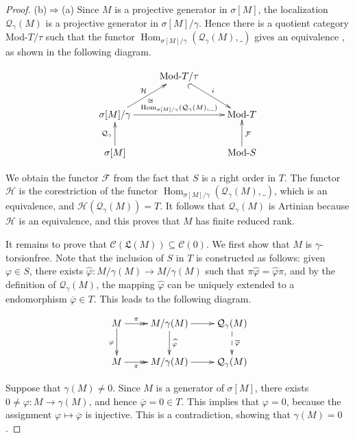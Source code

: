 \documentclass{amsart}
\theoremstyle{definition}
\theoremstyle{remark}
\numberwithin{equation}{section}
\DeclareMathOperator{\Hom}{Hom}
\newcommand{\sm}{\sigma[M]}
\begin{document}
\begin{proof}
	(b)$\Rightarrow$(a) 
	Since $M$ is a projective generator in $\sm$, 
	the localization $\mathcal{Q}_\gamma(M)$ 
	is a projective generator in $\sm/\gamma$. 
	Hence there is a quotient category Mod-$T/\tau$ 
	such that the functor 
	$\Hom_{\sm/\gamma}(\mathcal{Q}_\gamma(M),\_)$ 
	gives an equivalence \cite[Ch. X, Theorem 4.1]{stenstromrings},
	as shown in the following diagram.
	
	\[\xymatrix{ & \text{Mod-}T/\tau\ar@{_(-{>}}[rd]^i & \\ 
		\sm/\gamma\ar[rr]^-{\Hom_{\sm/\gamma}(\mathcal{Q}_\gamma(M),\_)}
		\ar[ur]_\cong^{\mathcal{H}} & & \text{Mod-}T \\ 
		\sm\ar[u]^{\mathcal{Q}_\gamma}%
		& & \text{Mod-}S\ar[u]_{\mathcal{F}} }\]
	
	We obtain the functor $\mathcal{F}$ 
	from the fact that $S$ is a right order in $T$. 
	The functor $\mathcal{H}$ 
	is the corestriction of the functor 
	$\Hom_{\sm/\gamma}(\mathcal{Q}_\gamma(M),\_)$,
	which is an equivalence,
	and $\mathcal{H}(\mathcal{Q}_\gamma(M))=T$. 
	It follows that $\mathcal{Q}_\gamma(M)$ is Artinian 
	because $\mathcal{H}$ is an equivalence, 
	and this proves that $M$ has finite reduced rank.
	
	It remains to prove that 
	$\mathcal{C}(\mathfrak{L}(M))\subseteq\mathcal{C}(0)$. 
	We first show that $M$ is $\gamma$-torsionfree. 
	Note that the inclusion  of $S$ in $T$ is constructed as follows: 
	given $\varphi\in S$, 
	there exists $\widehat{\varphi}:M/\gamma(M)\to M/\gamma(M)$ 
	such that $\pi\widehat{\varphi}=\widehat{\varphi}\pi$,
	and by the  definition of $\mathcal{Q}_\gamma(M)$, 
	the mapping $\widehat{\varphi}$ can be uniquely extended 
	to a endomorphism $\overline{\varphi}\in T$.
	This leads to the following diagram.
	
	\[\xymatrix{M\ar@{-{>>}}[r]^-\pi \ar[d]_\varphi 
		& M/\gamma(M)\ar[r]\ar[d]^{\widehat{\varphi}} 
		& \mathcal{Q}_\gamma(M)\ar@{--{>}}[d]^{\overline{\varphi}} \\ 
		M\ar@{-{>>}}[r]_-\pi 
		& M/\gamma(M)\ar[r] 
		& \mathcal{Q}_\gamma(M)}\]
	
	\noindent
	Suppose that $\gamma(M)\neq 0$. 
	Since $M$ is a generator of $\sm$, 
	there exists $0\neq\varphi:M\to \gamma(M)$, 
	and hence $\overline{\varphi}=0\in T$. 
	This implies that $\varphi=0$, because the assignment
	$\varphi\mapsto\overline{\varphi}$ is injective. 
	This is a contradiction, 
	showing that $\gamma(M)=0$.
	

\end{proof}
\end{document}
